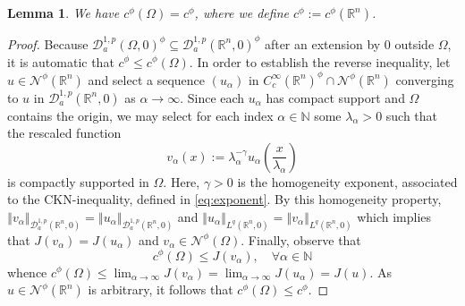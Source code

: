 \documentclass[10pt, reqno]{amsart}
\newcommand{\NN}{\mathbb{N}}
\newcommand{\RR}{\mathbb{R}}
\newcommand{\Om}{\Omega}
\newcommand{\norm}[1]{\left\Vert #1 \right\Vert}
\newcommand{\D}{\mathcal{D}}
\newcommand{\N}{\mathcal{N}}
\numberwithin{equation}{section}
\theoremstyle{definition}
\theoremstyle{remark}
\theoremstyle{plain}
\newtheorem{lem}[prop]{Lemma}
\begin{document}
	\begin{lem}\label{lem:minimalEnergyInvariance}
		We have $c^\phi(\Om) = c^\phi$, where we define $c^\phi := c^\phi(\RR^n)$. 
	\end{lem}
	\begin{proof}
		Because $\D_a^{1,p}(\Om,0)^\phi \subseteq \D_a^{1,p}(\RR^n,0)^\phi$ after an extension by 0 outside $\Om$, it is automatic that $c^\phi \le c^\phi(\Om)$. In order to establish the reverse inequality, let $u \in \N^\phi(\RR^n)$ and select a sequence $(u_\alpha)$ in $C_c^\infty(\RR^n)^\phi \cap \N^\phi(\RR^n)$ converging to $u$ in $\D_a^{1,p}(\RR^n,0)$ as $\alpha \to \infty$. Since each $u_\alpha$ has compact support and $\Om$ contains the origin, we may select for each index $\alpha \in \NN$ some $\lambda_\alpha > 0$ such that the rescaled function
		\[
		v_\alpha(x) := \lambda_\alpha^{-\gamma} u_\alpha\left(\frac{x}{\lambda_\alpha}\right)
		\]
		is compactly supported in $\Om$. Here, $\gamma > 0$ is the homogeneity exponent, associated to the CKN-inequality, defined in \eqref{eq:exponent}. By this homogeneity property, $\norm{v_\alpha}_{\D_a^{1,p}(\RR^n,0)} = \norm{u_\alpha}_{\D_a^{1,p}(\RR^n,0)}$ and $\norm{u_\alpha}_{L^q(\RR^n,0)} = \norm{v_\alpha}_{L^q(\RR^n,0)}$ which implies that $J(v_\alpha) = J(u_\alpha)$ and $v_\alpha \in \N^\phi(\Om)$. Finally, observe that
		\[
		c^\phi(\Om) \le J(v_\alpha), \quad \forall \alpha \in \NN
		\]
		whence $c^\phi(\Om) \le \lim_{\alpha \to \infty} J(v_\alpha) = \lim_{\alpha \to \infty} J(u_\alpha) = J(u)$. As $u \in \N^\phi(\RR^n)$ is arbitrary, it follows that $c^\phi(\Om) \le c^\phi$.
	\end{proof}
	
\end{document}
